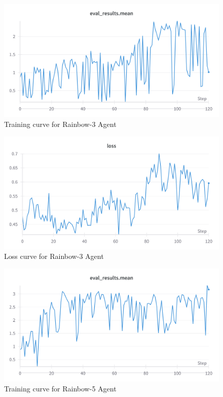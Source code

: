   \begin{figure}[h]
    \centering
    \includegraphics[width=\linewidth]{results/RAINBOW-3-mean.png}
    \caption{
      Training curve for Rainbow-3 Agent
    }
    \label{fig:rainbow3}
  \end{figure}
  \begin{figure}[h]
    \centering
    \includegraphics[width=\linewidth]{results/RAINBOW-3-loss.png}
    \caption{
        Loss curve for Rainbow-3 Agent
    }
    \label{fig:rainbow3loss}
\end{figure}


\begin{figure}[h]
  \centering
  \includegraphics[width=\linewidth]{results/RAINBOW-5-mean.png}
  \caption{
    Training curve for Rainbow-5 Agent
  }
  \label{fig:rainbow5}
\end{figure}

